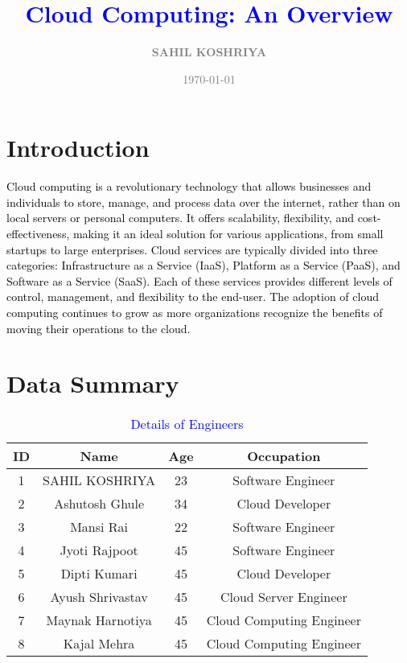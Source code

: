 \documentclass[12pt]{article}
\title{\textbf{\textcolor{blue}{Cloud Computing: An Overview}}}
\author{\textbf{\textcolor{gray}{SAHIL KOSHRIYA}}}
\date{\textcolor{gray}{\today}}
\begin{document}
\maketitle

\section{Introduction}
\textcolor{black}{
Cloud computing is a revolutionary technology that allows businesses and individuals to store, manage, and process data over the internet, rather than on local servers or personal computers. It offers scalability, flexibility, and cost-effectiveness, making it an ideal solution for various applications, from small startups to large enterprises. Cloud services are typically divided into three categories: Infrastructure as a Service (IaaS), Platform as a Service (PaaS), and Software as a Service (SaaS). Each of these services provides different levels of control, management, and flexibility to the end-user. The adoption of cloud computing continues to grow as more organizations recognize the benefits of moving their operations to the cloud.
}

\section{Data Summary}
\begin{table}[h]
    \centering
    \begin{tabular}{|c|c|c|c|}
        \hline
        \rowcolor{gray!20}
        \textbf{ID} & \textbf{Name} & \textbf{Age} & \textbf{Occupation} \\
        \hline
        1 & SAHIL KOSHRIYA & 23 & Software Engineer \\
        \hline
        2 & Ashutosh Ghule & 34 & Cloud Developer \\
        \hline
        3 & Mansi Rai & 22 & Software Engineer \\
        \hline
        4 & Jyoti Rajpoot & 45 & Software Engineer \\
        \hline
        5 & Dipti Kumari & 45 & Cloud Developer \\
        \hline
        6 & Ayush Shrivastav & 45 & Cloud Server Engineer \\
        \hline
        7 & Maynak Harnotiya & 45 & Cloud Computing Engineer \\
        \hline
        8 & Kajal Mehra & 45 & Cloud Computing Engineer \\
        \hline
    \end{tabular}
    \caption{\textcolor{blue}{Details of Engineers}}
    \label{tab:sample}
\end{table}
\end{document}
